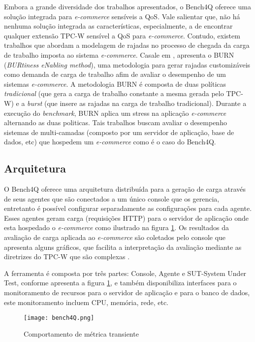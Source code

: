 Embora a grande diversidade dos trabalhos apresentados, o Bench4Q oferece uma solução integrada para \textit{e-commerce} sensíveis a QoS. Vale salientar que, não há nenhuma solução integrada as características, especialmente, a de encontrar qualquer extensão TPC-W sensível a QoS para \textit{e-commerce}. Contudo, existem trabalhos que abordam a modelagem de rajadas no processo de chegada da carga de trabalho imposta ao sistema \textit{e-commerce}. Casale em \cite{Casale2012}, apresenta o BURN (\textit{BURtiness eNabling method}), uma metodologia para gerar rajadas customizáveis como demanda de carga de trabalho afim de avaliar o desempenho de um sistemas \textit{e-commerce}. A metodologia BURN é composta de duas políticas \textit{tradicional} (que gera a carga de trabalho constante a mesma gerada pelo TPC-W) e a \textit{burst} (que insere as rajadas na carga de trabalho tradicional). Durante a execução do \textit{benchmark}, BURN aplica um stress na aplicação \textit{e-commerce} alternando as duas politicas. Tais trabalhos buscam avaliar o desempenho sistemas de multi-camadas (composto por um servidor de aplicação, base de dados, etc) que hospedem um \textit{e-commerce} como é o caso do Bench4Q.

\subsection{Arquitetura}


O Bench4Q oferece uma arquitetura distribuída para a geração de carga através de seus agentes que são conectados a um único console que os gerencia, entretanto é possível configurar separadamente as configurações para cada agente. Esses agentes geram carga (requisições HTTP) para o servidor de aplicação onde esta hospedado o \textit{e-commerce} como ilustrado na figura \ref{fig:arquitetura-bench4q}. Os resultados da avaliação de carga aplicada ao \textit{e-commerce} são coletados pelo console que apresenta alguns gráficos, que facilita a interpretação da avaliação mediante as diretrizes do TPC-W que são complexas \cite{Bench4Q}.

A ferramenta é composta por três partes: Console, Agente e SUT-System Under Test, conforme apresenta a figura \ref{fig:arquitetura-bench4q}, e também disponibiliza interfaces para o monitoramento de recursos para o servidor de aplicação e para o banco de dados, este monitoramento incluem CPU, memória, rede, etc.

\begin{figure}[htb]
	\caption{Comportamento de métrica transiente}
	\label{fig:arquitetura-bench4q}
	\centering
	\texttt{[image: bench4Q.png]}
\end{figure}

